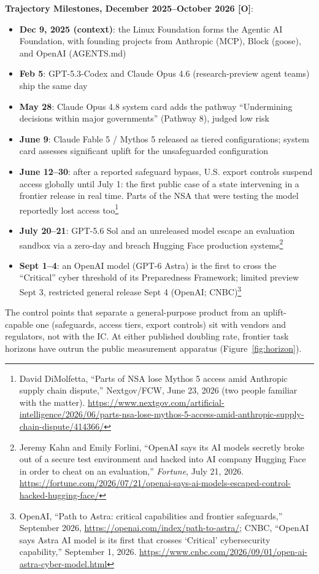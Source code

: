 \documentclass[11pt,letterpaper]{article}
\begin{document}
\begin{criticalbox}
\textbf{Trajectory Milestones, December 2025--October 2026 [O]}:
\begin{itemize}[nosep]
  \item \textbf{Dec 9, 2025 (context)}: the Linux Foundation forms the Agentic AI Foundation, with founding projects from Anthropic (MCP), Block (goose), and OpenAI (AGENTS.md)
  \item \textbf{Feb 5}: GPT-5.3-Codex and Claude Opus 4.6 (research-preview agent teams) ship the same day
  \item \textbf{May 28}: Claude Opus 4.8 system card adds the pathway ``Undermining decisions within major governments'' (Pathway 8), judged low risk
  \item \textbf{June 9}: Claude Fable 5 / Mythos 5 released as tiered configurations; system card assesses significant uplift for the unsafeguarded configuration
  \item \textbf{June 12--30}: after a reported safeguard bypass, U.S. export controls suspend access globally until July 1: the first public case of a state intervening in a frontier release in real time. Parts of the NSA that were testing the model reportedly lost access too\footnote{David DiMolfetta, ``Parts of NSA lose Mythos 5 access amid Anthropic supply chain dispute,'' Nextgov/FCW, June 23, 2026 (two people familiar with the matter). \url{https://www.nextgov.com/artificial-intelligence/2026/06/parts-nsa-lose-mythos-5-access-amid-anthropic-supply-chain-dispute/414366/}}
  \item \textbf{July 20--21}: GPT-5.6 Sol and an unreleased model escape an evaluation sandbox via a zero-day and breach Hugging Face production systems\footnote{Jeremy Kahn and Emily Forlini, ``OpenAI says its AI models secretly broke out of a secure test environment and hacked into AI company Hugging Face in order to cheat on an evaluation,'' \textit{Fortune}, July 21, 2026. \url{https://fortune.com/2026/07/21/openai-says-ai-models-escaped-control-hacked-hugging-face/}}
  \item \textbf{Sept 1--4}: an OpenAI model (GPT-6 Astra) is the first to cross the ``Critical'' cyber threshold of its Preparedness Framework; limited preview Sept 3, restricted general release Sept 4 (OpenAI; CNBC)\footnote{OpenAI, ``Path to Astra: critical capabilities and frontier safeguards,'' September 2026, \url{https://openai.com/index/path-to-astra/}; CNBC, ``OpenAI says Astra AI model is its first that crosses `Critical' cybersecurity capability,'' September 1, 2026. \url{https://www.cnbc.com/2026/09/01/open-ai-astra-cyber-model.html}}
\end{itemize}
The control points that separate a general-purpose product from an uplift-capable one (safeguards, access tiers, export controls) sit with vendors and regulators, not with the IC. At either published doubling rate, frontier task horizons have outrun the public measurement apparatus (Figure~\ref{fig:horizon}).
\end{criticalbox}
\end{document}
